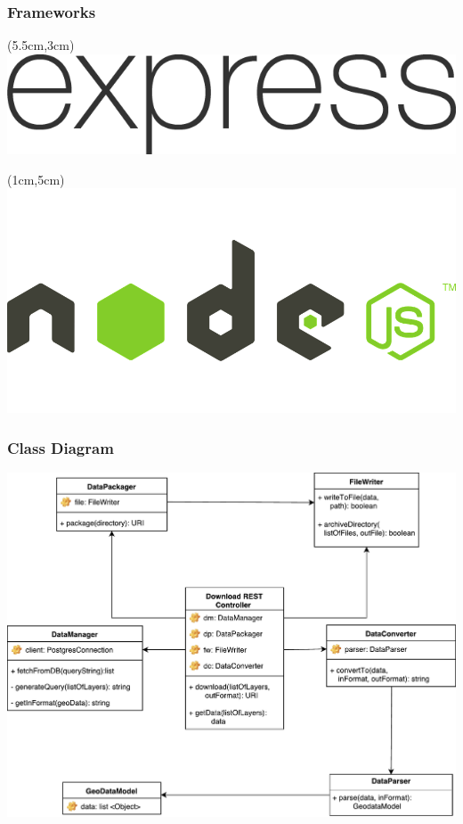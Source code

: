 \documentclass[xcolor=table]{beamer}
\begin{document}
\begin{frame}
	\frametitle{Frameworks}
	\begin{textblock*}{6cm}(5.5cm,3cm) %
		\includegraphics[width=\textwidth]{express.png}
	\end{textblock*}
	\begin{textblock*}{6cm}(1cm,5cm) %
		\includegraphics[width=\textwidth]{node.png}
	\end{textblock*}
\end{frame}
\begin{frame}
	\frametitle{Class Diagram}
	\begin{center}
		\includegraphics[width=0.8\linewidth]{class_diagram.pdf}
	\end{center}
\end{frame}
\end{document}
